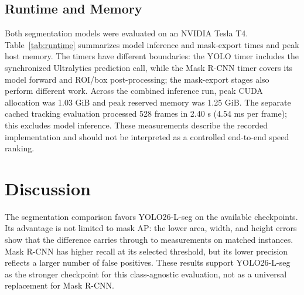 \documentclass[11pt,a4paper]{article}
\begin{document}
\subsection{Runtime and Memory}

Both segmentation models were evaluated on an NVIDIA Tesla T4. Table~\ref{tab:runtime} summarizes model inference and mask-export times and peak host memory. The timers have different boundaries: the YOLO timer includes the synchronized Ultralytics prediction call, while the Mask R-CNN timer covers its model forward and ROI/box post-processing; the mask-export stages also perform different work. Across the combined inference run, peak CUDA allocation was 1.03 GiB and peak reserved memory was 1.25 GiB. The separate cached tracking evaluation processed 528 frames in 2.40 s (4.54 ms per frame); this excludes model inference. These measurements describe the recorded implementation and should not be interpreted as a controlled end-to-end speed ranking.

\begin{table}[!htbp]
\centering\small
\caption{Runtime and memory measurements from the fresh Tesla T4 evaluation. Timing boundaries differ by model.}
\label{tab:runtime}
\end{table}

\section{Discussion}

The segmentation comparison favors YOLO26-L-seg on the available checkpoints. Its advantage is not limited to mask AP: the lower area, width, and height errors show that the difference carries through to measurements on matched instances. Mask R-CNN has higher recall at its selected threshold, but its lower precision reflects a larger number of false positives. These results support YOLO26-L-seg as the stronger checkpoint for this class-agnostic evaluation, not as a universal replacement for Mask R-CNN.
\end{document}
